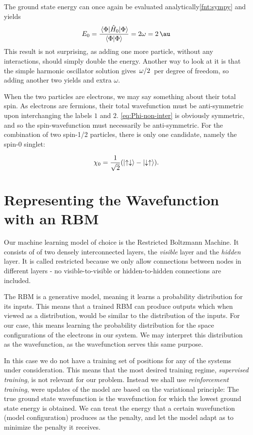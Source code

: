 \documentclass[a4paper, 11pt]{article}
\begin{document}
\begin{multicols}{2}
    The ground state energy can once again be evaluated
    analytically\cref{fnt:sympy} and yields
    \begin{align}
        E_0 = \frac{\expval{\hat H_0}{\Phi}}{\braket{\Phi}}
        = 2\omega =\SI{2}{\au}
    \end{align}
    This result is not surprising, as adding one more particle, without any
    interactions, should simply double the energy. Another way to look at it is
    that the simple harmonic oscillator solution gives $\flatfrac{\omega}{2}$
    per degree of freedom, so adding another two yields and extra $\omega$.


    When the two particles are electrons, we may say something about their total
    spin. As electrons are fermions, their total wavefunction must be
    anti-symmetric upon interchanging the labels $1$ and $2$.
    \autoref{eq:Phi-non-inter} is obviously symmetric, and so the
    spin-wavefunction must necessarily be anti-symmetric. For the combination of
    two spin-1/2 particles, there is only one candidate, namely the spin-0
    singlet:

    \begin{align}
        \chi_0 = \frac{1}{\sqrt 2}\qty(\ket{\uparrow\downarrow} -
        \ket{\downarrow\uparrow}).
    \end{align}

    \section{Representing the Wavefunction with an RBM}

    Our machine learning model of choice is the Restricted Boltzmann Machine. It
    consists of of two densely interconnected layers, the \emph{visible} layer
    and the \emph{hidden} layer. It is called restricted because we only
    allow connections between nodes in different layers - no visible-to-visible or
    hidden-to-hidden connections are included.

    The RBM is a generative model, meaning it learns a probability distribution
    for its inputs. This means that a trained RBM can produce outputs which
    when viewed as a distribution, would be similar to the distribution of the
    inputs. For our case, this means learning the probability distribution for
    the space configurations of the electrons in our system. We may interpret
    this distribution as the wavefunction, as the wavefunction serves this same
    purpose.

    In this case we do not have a training set of positions for any of the
    systems under consideration. This means that the most desired training
    regime, \emph{supervised training}, is not relevant for our problem. Instead
    we shall use \emph{reinforcement training}, were updates of the model are
    based on the variational principle: The true ground state wavefunction is
    the wavefunction for which the lowest ground state energy is obtained. We
    can treat the energy that a certain wavefunction (model configuration)
    produces as the penalty, and let the model adapt as to minimize the penalty
    it receives.


\end{multicols}
\end{document}
